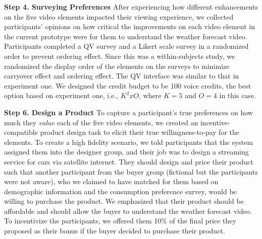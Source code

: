 \textbf{Step 4. Surveying Preferences} After experiencing how different enhancements on the five video elements impacted their viewing experience, we collected participants' opinions on how critical the improvements on each video element in the current prototype were for them to understand the weather forecast video. Participants completed  a QV survey and a Likert scale survey in a randomized order to prevent ordering effect. Since this was a within-subjects study, we randomized the display order of the elements on the surveys to minimize carryover effect and ordering effect. The QV interface was similar to that in experiment one. We designed the credit budget to be 100 voice credits, the best option based on experiment one, i.e., $K^2 x O$, where $K=5$ and $O=4$ in this case.


\textbf{Step 6. Design a Product} To capture a participant's true preferences on how much they \textit{value} each of the five video elements, we created an incentive-compatible product design task to elicit their true willingness-to-pay for the elements. To create a high fidelity scenario, we told participants that the system assigned them into the designer group, and their job was to design a streaming service for cars via satellite internet. They should design and price their product such that another participant from the buyer group (fictional but the participants were not aware), who we claimed to have matched for them based on demographic information and the consumption preference survey, would be willing to purchase the product. We emphasized that their product should be affordable and should allow the buyer to understand the weather forecast video. To incentivize the participants, we offered them 10\% of the final price they proposed as their bonus if the buyer decided to purchase their product.


